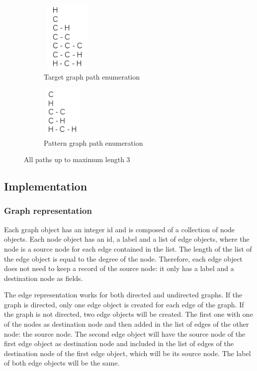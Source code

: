 \documentclass{l4proj}
\theoremstyle{definition}
\begin{document}
\begin{figure}[h]
\centering
\begin{subfigure}{.5\textwidth}
  \centering
  \includegraphics[height=3.5cm,width=2.5cm]{graphs_paths/C5H11-paths.png}
  \caption{Target graph path enumeration}
  \label{C5H11-paths}
\end{subfigure}%
\begin{subfigure}{.5\textwidth}
  \centering
  \includegraphics[height=2.5cm,width=2cm]{graphs_paths/CH3-paths.png}
  \caption{Pattern graph path enumeration}
  \label{CH3-paths}
\end{subfigure}
\caption{All paths up to maximum length 3}
\label{pathsEnumeration}
\end{figure}
         
\subsection{Implementation}
\subsubsection{Graph representation}
	Each graph object has an integer id and is composed of a collection of node objects. Each node object has an id, a label and a list of edge objects, where the node is a source node for each edge contained in the list. The length of the list of the edge object is equal to the degree of the node. Therefore, each edge object does not need to keep a record of the source node: it only has a label and a destination node as fields.
    
    The edge representation works for both directed and undirected graphs. If the graph is directed, only one edge object is created for each edge of the graph. If the graph is not directed, two edge objects will be created. The first one with one of the nodes as destination node and then added in the list of edges of the other node: the source node. The second edge object will have the source node of the first edge object as destination node and included in the list of edges of the destination node of the first edge object, which will be its source node. The label of both edge objects will be the same.
    
\end{document}
